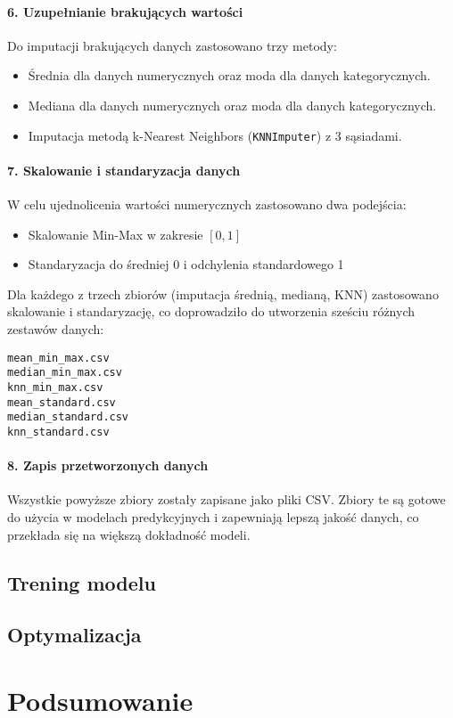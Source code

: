 \documentclass[10pt,letterpaper]{article}
\begin{document}
\paragraph{6. Uzupełnianie brakujących wartości}
Do imputacji brakujących danych zastosowano trzy metody:
\begin{itemize}
    \item Średnia dla danych numerycznych oraz moda dla danych kategorycznych.
    \item Mediana dla danych numerycznych oraz moda dla danych kategorycznych.
    \item Imputacja metodą k-Nearest Neighbors (\texttt{KNNImputer}) z 3 sąsiadami.
\end{itemize}

\paragraph{7. Skalowanie i standaryzacja danych}
W celu ujednolicenia wartości numerycznych zastosowano dwa podejścia:
\begin{itemize}
    \item Skalowanie Min-Max w zakresie $[0, 1]$
    \item Standaryzacja do średniej 0 i odchylenia standardowego 1
\end{itemize}
Dla każdego z trzech zbiorów (imputacja średnią, medianą, KNN) zastosowano skalowanie i standaryzację, co doprowadziło do utworzenia sześciu różnych zestawów danych:
\begin{verbatim}
mean_min_max.csv
median_min_max.csv
knn_min_max.csv
mean_standard.csv
median_standard.csv
knn_standard.csv
\end{verbatim}

\paragraph{8. Zapis przetworzonych danych}
Wszystkie powyższe zbiory zostały zapisane jako pliki CSV. Zbiory te są gotowe do użycia w modelach predykcyjnych i zapewniają lepszą jakość danych, co przekłada się na większą dokładność modeli.



\subsection{Trening modelu}

\subsection{Optymalizacja}

\section{Podsumowanie}


 
\end{document}

